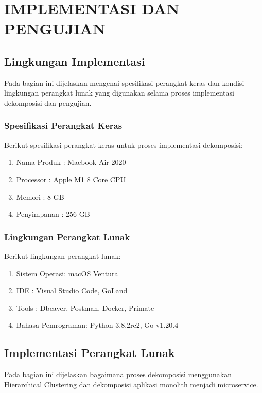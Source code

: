 \chapter{IMPLEMENTASI DAN PENGUJIAN}

\vspace{4.5pt}

\section{Lingkungan Implementasi}
Pada bagian ini dijelaskan mengenai spesifikasi perangkat keras dan kondisi lingkungan perangkat lunak yang digunakan selama proses implementasi dekomposisi dan pengujian.\\

\subsection{Spesifikasi Perangkat Keras}
Berikut spesifikasi perangkat keras untuk proses implementasi dekomposisi:

\begin{enumerate}[leftmargin=1.3cm]
	\item Nama Produk : Macbook Air 2020 
	\item Processor : Apple M1 8 Core CPU
	\item Memori : 8 GB
	\item Penyimpanan : 256 GB \\
\end{enumerate}


\subsection{Lingkungan Perangkat Lunak}
Berikut lingkungan perangkat lunak:

\begin{enumerate}[leftmargin=1.3cm]
	\item Sistem Operasi: macOS Ventura
	\item IDE : Visual Studio Code, GoLand 
	\item Tools : Dbeaver, Postman, Docker, Primate
	\item Bahasa Pemrograman: Python 3.8.2rc2, Go v1.20.4 \\
\end{enumerate}

\section{Implementasi Perangkat Lunak}
Pada bagian ini dijelaskan bagaimana proses dekomposisi menggunakan Hierarchical Clustering dan dekomposisi aplikasi monolith menjadi microservice.

